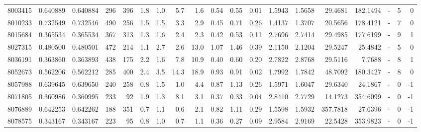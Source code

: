 \begin{tabular}{rrrrrrrrrrrrrrrrlrr}
   8003415 & 0.640889 &   0.640884 &  296 &  396 &      1.8 &      1.0 &     5.7 &      1.6 &       0.54 &        0.55 &        0.01 &  1.5943 &  1.5658 &   29.4681 &  182.1494 &             - &        5 &          0 \\
   8010233 & 0.732549 &   0.732546 &  490 &  256 &      1.5 &      1.5 &     3.3 &      2.9 &       0.45 &        0.71 &        0.26 &  1.4137 &  1.3707 &   20.5656 &  178.4121 &             - &        7 &          0 \\
   8015684 & 0.365534 &   0.365534 &  367 &  313 &      1.3 &      1.6 &     2.4 &      2.3 &       0.42 &        0.53 &        0.11 &  2.7696 &  2.7414 &   29.4985 &  177.6199 &             - &        9 &          1 \\
   8027315 & 0.480500 &   0.480501 &  472 &  214 &      1.1 &      2.7 &     2.6 &     13.0 &       1.07 &        1.46 &        0.39 &  2.1150 &  2.1204 &   29.5247 &   25.4842 &             - &        5 &          0 \\
   8036191 & 0.363860 &   0.363893 &  438 &  175 &      2.2 &      1.6 &     7.8 &     10.9 &       0.40 &        0.60 &        0.20 &  2.7822 &  2.8768 &   29.5116 &    7.7688 &             - &        8 &          1 \\
   8052673 & 0.562206 &   0.562212 &  285 &  400 &      2.4 &      3.5 &    14.3 &     18.9 &       0.93 &        0.91 &        0.02 &  1.7992 &  1.7842 &   48.7092 &  180.3427 &             - &        8 &          0 \\
   8057988 & 0.639645 &   0.639650 &  240 &  258 &      0.8 &      1.5 &     1.0 &      4.4 &       0.87 &        1.13 &        0.26 &  1.5971 &  1.6047 &   29.6340 &   24.1867 &             - &        0 &         -1 \\
   8071805 & 0.360986 &   0.360995 &  233 &   92 &      1.9 &      1.3 &     8.1 &      3.1 &       0.37 &        0.33 &        0.04 &  2.8410 &  2.7729 &   14.1273 &  354.6099 &             - &        0 &         -1 \\
   8076889 & 0.642253 &   0.642262 &  188 &  351 &      0.7 &      1.1 &     0.6 &      2.1 &       0.82 &        1.11 &        0.29 &  1.5598 &  1.5932 &  357.7818 &   27.6396 &             - &        0 &         -1 \\
   8078575 & 0.343167 &   0.343167 &  223 &   95 &      0.8 &      1.0 &     0.7 &      1.1 &       0.36 &        0.27 &        0.09 &  2.9584 &  2.9169 &   22.5428 &  353.9823 &             - &        0 &         -1 \\

\end{tabular}
